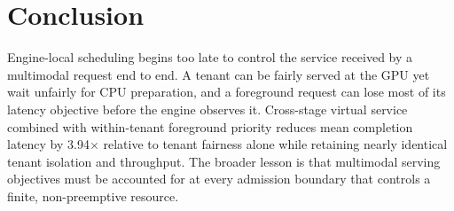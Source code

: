 \documentclass[sigconf,review,anonymous]{acmart}
\begin{document}
\section{Conclusion}

Engine-local scheduling begins too late to control the service received by a
multimodal request end to end. A tenant can be fairly served at the GPU yet
wait unfairly for CPU preparation, and a foreground request can lose most of
its latency objective before the engine observes it. Cross-stage virtual
service combined with within-tenant foreground priority reduces mean
completion latency by 3.94$\times$ relative to tenant fairness alone while
retaining nearly identical tenant isolation and throughput. The broader
lesson is that multimodal serving objectives must be accounted for at every
admission boundary that controls a finite, non-preemptive resource.



\end{document}
